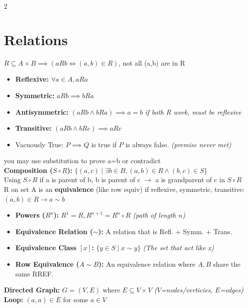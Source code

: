 \documentclass[10pt]{article}
\begin{document}
\begin{multicols*}{2}
\section{Relations}
$R \subseteq A \times B \implies (aRb \iff (a, b) \in R)$, not all (a,b) are in R\\
\begin{itemize}
    \item \textbf{Reflexive:} $\forall a \in A, aRa$
    \item \textbf{Symmetric:} $aRb \implies bRa$
    \item \textbf{Antisymmetric:} $(aRb \land bRa) \implies a = b$\hspace{0.3cm} \textit{if both R work, must be reflexive}
    \item \textbf{Transitive:} $(aRb \land bRc) \implies aRc$
    \item {Vacuously True:} $P \implies Q$ is true if $P$ is always false. \textit{(premise never met)}
\end{itemize}
you may use substitution to prove a=b or contradict\\
\textbf{Composition ($S \circ R$):} $\{(a, c) \mid \exists b \in B, (a, b) \in R \land (b, c) \in S \}$\\
Using $S \circ R$ if a is parent of b, b is parent of c $\to$ a is grandparent of c in $S \circ R$\\
R on set A is an \textbf{equivalence} (like row equiv) if reflexive, symmetric, transitive:\\
$(a,b) \in R \to a\sim b$\\
\begin{itemize}
    \item \textbf{Powers ($R^n$):} $R^1 = R, R^{n+1} = R^n \circ R$ \hfill \textit{(path of length $n$)}
    \item \textbf{Equivalence Relation ($\sim$):} A relation that is Refl. + Symm. + Trans.
    \item \textbf{Equivalence Class $[x]$:} $\{y \in S \mid x \sim y\}$ \hfill \textit{(The set that act like x)}
    \item \textbf{Row Equivalence ($A \sim B$):} An equivalence relation where $A, B$ share the same RREF.
\end{itemize}
\textbf{Directed Graph:} $G = (V, E)$ where $E \subseteq V \times V$ \hfill \textit{($V$=nodes/verticies, $E$=edges)}\\
\textbf{Loop:} $(a, a) \in E$ for some $a \in V$

\end{multicols*}
\end{document}
